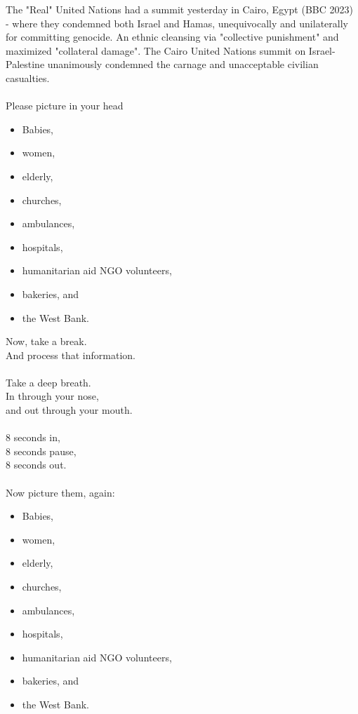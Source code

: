 \documentclass[16pt,openany,oneside]{book}
\begin{document}
The 
    "Real" 
United Nations had a summit yesterday in Cairo, Egypt (BBC 2023) - where they condemned both Israel and Hamas, unequivocally and unilaterally for committing genocide. An ethnic cleansing via       
    "collective punishment" 
and maximized 
    "collateral damage". 
The Cairo United Nations summit on Israel-Palestine unanimously condemned the carnage and unacceptable civilian casualties. 
\\\\
Please picture in your head 

\begin{itemize}
    \item Babies,
    \item women, 
    \item elderly, 
    \item churches, 
    \item ambulances, 
    \item hospitals, 
    \item humanitarian aid NGO volunteers, 
    \item bakeries, and 
    \item the West Bank. 
\end{itemize}

\noindent Now, take a break. \\ 
And process that information.
\\\\
Take a deep breath. \\
In through your nose, \\ 
and out through your mouth. 
\\\\
8 seconds in, \\
8 seconds pause, \\ 
8 seconds out. 
\\\\
Now picture them, again:

\begin{itemize}
    \item Babies,
    \item women, 
    \item elderly, 
    \item churches, 
    \item ambulances, 
    \item hospitals, 
    \item humanitarian aid NGO volunteers, 
    \item bakeries, and 
    \item the West Bank. 
\end{itemize}
\end{document}
